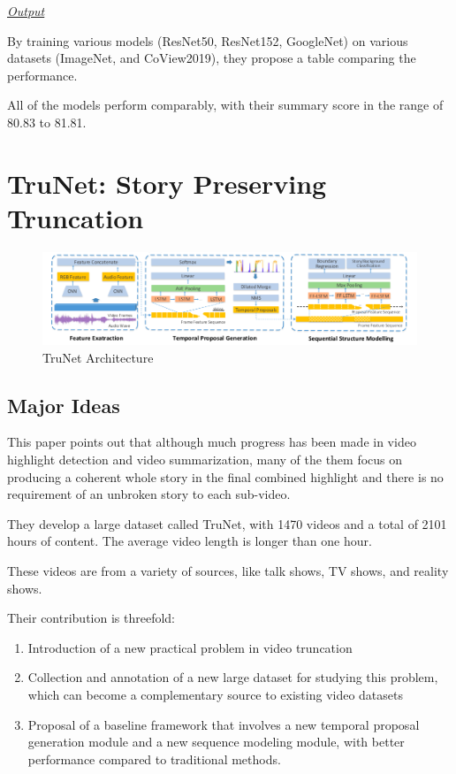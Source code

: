     	\textit{\underline{Output}}
    
    		By training various models (ResNet50, ResNet152, GoogleNet) on various datasets (ImageNet, and CoView2019), they propose a table comparing the performance.
    		
    		All of the models perform comparably, with their summary score in the range of 80.83 to 81.81. 
			
\section{TruNet: Story Preserving Truncation \texorpdfstring{\cite{yang_2019_trunet}}{}}
    \begin{figure}[ht]
    	\centering
    		\includegraphics[width=\textwidth]{P3Arch}
    	\caption{TruNet Architecture}
    	\label{fig:p3arch}
    \end{figure}
    			
    \subsection{Major Ideas}
    	This paper points out that although much progress has been made in video highlight detection and video summarization, many of the them focus on producing a coherent whole story in the final combined highlight and there is no requirement of an unbroken story to each sub-video.
    	
    	They develop a large dataset called TruNet, with 1470 videos and a total of 2101 hours of content. The average video length is longer than one hour.
    	
    	These videos are from a variety of sources, like talk shows, TV shows, and reality shows.
    	
    	Their contribution is threefold:
    	
    	\begin{enumerate}
    		\item Introduction of a new practical problem in video truncation
    		\item Collection and annotation of a new large dataset for studying this problem, which can become a complementary source to existing video datasets
    		\item Proposal of a baseline framework that involves a new temporal proposal generation module and a new sequence modeling module, with better performance compared to traditional methods.
    	\end{enumerate}
    
